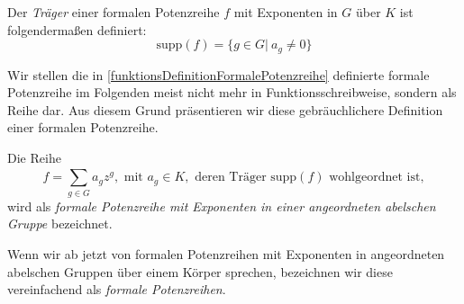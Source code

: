 

\begin{defn}\label{TraegerFormalePotenzreihe}
Der \textit{Träger} einer formalen Potenzreihe $f$ mit Exponenten in $G$ über $K$ ist folgendermaßen definiert: 
\[ \text{supp}(f) = \lbrace g \in G \vert ~ a_g \neq 0\rbrace\]
\end{defn}
%
%
%
Wir stellen die in \ref{funktionsDefinitionFormalePotenzreihe} definierte formale Potenzreihe im Folgenden meist nicht mehr in Funktionsschreibweise, sondern als Reihe dar. Aus diesem Grund präsentieren wir diese gebräuchlichere Definition einer formalen Potenzreihe.
\begin{defn}
Die Reihe 
\[f = \sum_{g \in G}^{}a_g z^g, \text{ mit } a_g \in K, \text{ deren Träger supp}(f) \text{ wohlgeordnet ist}, \]
wird als \textit{formale Potenzreihe mit Exponenten in einer angeordneten abelschen Gruppe} bezeichnet.
\end{defn}
%
%
% 
%
%
%
\begin{nota}
Wenn wir ab jetzt von formalen Potenzreihen mit Exponenten in angeordneten abelschen Gruppen über einem Körper sprechen, bezeichnen wir diese vereinfachend als \textit{formale Potenzreihen}.
\end{nota}
%
%
%
%
%
%
%
